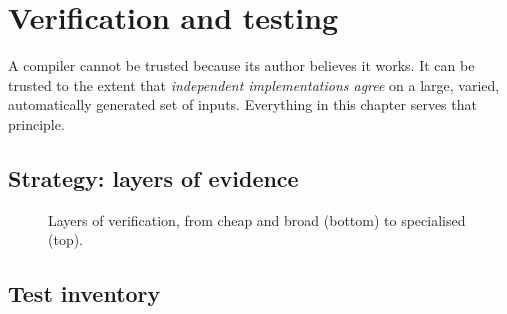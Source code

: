 \chapter{Verification and testing}
\label{ch:verify}

\begin{keybox}
A compiler cannot be trusted because its author believes it works. It can be trusted to the extent that \emph{independent implementations agree} on a large, varied, automatically generated set of inputs. Everything in this chapter serves that principle.
\end{keybox}

\section{Strategy: layers of evidence}
\begin{figure}[H]\centering
{}
\caption{Layers of verification, from cheap and broad (bottom) to specialised (top).}
\end{figure}

\section{Test inventory}
\begin{table}[H]\centering\small\caption{C++ unit tests by suite (counted from the real test run; \CppTestsFailed{} failures).}\end{table}
\begin{table}[H]\centering\small\caption{Backend (pytest) tests.}\end{table}
\begin{table}[H]\centering\small\caption{Frontend (Vitest) tests.}\end{table}

